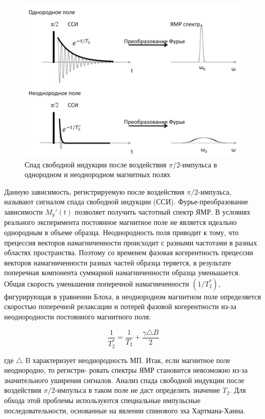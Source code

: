 \documentclass{article}
\begin{document}
\begin{figure}[h!]
    \centering
    \includegraphics[scale = 0.3]{фурье.png}
    \caption{Спад свободной индукции после воздействия $\pi/2$-импульса в однородном и неоднородном магнитных полях}
    \label{fig0}
\end{figure}

Данную зависимость, регистрируемую после воздействия $\pi/2$-импульса, называют сигналом спада свободной индукции (ССИ). Фурье-преобразование зависимости $M_y′(t)$ позволяет получить частотный спектр ЯМР. В условиях реального эксперимента постоянное магнитное поле не является идеально однородным в объеме образца. Неоднородность поля приводит к тому, что прецессия векторов намагниченности происходит с разными частотами в разных областях пространства. Поэтому со временем фазовая когерентность прецессии векторов намагниченности разных частей образца теряется, в результате поперечная компонента суммарной намагниченности образца уменьшается. Общая скорость уменьшения поперечной намагниченности $(1/T_2^{*})$, фигурирующая в уравнении Блоха, в неоднородном магнитном поле определяется скоростью поперечной релаксации и потерей фазовой когерентности из-за неоднородности постоянного магнитного поля:

\begin{equation*}
\frac{1}{T_2^*} = \frac{1}{T_2} + \frac{\gamma\triangle B}{2}
\end{equation*}

 где $\triangle$ B характеризует неоднородность МП. Итак, если магнитное поле неоднородно, то регистри- ровать спектры ЯМР становится невозможно из-за значительного уширения сигналов. Анализ спада свободной индукции после воздействия $\pi/2$-импульса в таком поле не даст определить значение $T_2$. Для обхода этой проблемы используются специальные импульсные последовательности, основанные на явлении спинового эха Хартмана-Ханна.
\end{document}

